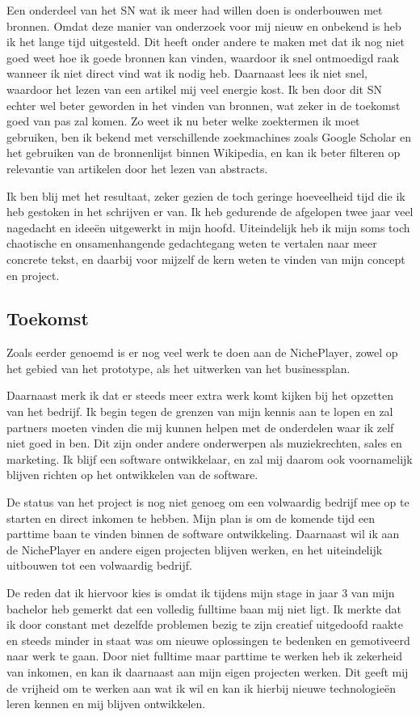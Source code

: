 Een onderdeel van het SN wat ik meer had willen doen is onderbouwen met bronnen. Omdat deze manier van onderzoek voor mij nieuw en onbekend is heb ik het lange tijd uitgesteld. Dit heeft onder andere te maken met dat ik nog niet goed weet hoe ik goede bronnen kan vinden, waardoor ik snel ontmoedigd raak wanneer ik niet direct vind wat ik nodig heb. Daarnaast lees ik niet snel, waardoor het lezen van een artikel mij veel energie kost. Ik ben door dit SN echter wel beter geworden in het vinden van bronnen, wat zeker in de toekomst goed van pas zal komen. Zo weet ik nu beter welke zoektermen ik moet gebruiken, ben ik bekend met verschillende zoekmachines zoals Google Scholar en het gebruiken van de bronnenlijst binnen Wikipedia, en kan ik beter filteren op relevantie van artikelen door het lezen van abstracts.

Ik ben blij met het resultaat, zeker gezien de toch geringe hoeveelheid tijd die ik heb gestoken in het schrijven er van. Ik heb gedurende de afgelopen twee jaar veel nagedacht en ideeën uitgewerkt in mijn hoofd. Uiteindelijk heb ik mijn soms toch chaotische en onsamenhangende gedachtegang weten te vertalen naar meer concrete tekst, en daarbij voor mijzelf de kern weten te vinden van mijn concept en project.

\subsection{Toekomst}
Zoals eerder genoemd is er nog veel werk te doen aan de NichePlayer, zowel op het gebied van het prototype, als het uitwerken van het businessplan.

Daarnaast merk ik dat er steeds meer extra werk komt kijken bij het opzetten van het bedrijf. Ik begin tegen de grenzen van mijn kennis aan te lopen en zal partners moeten vinden die mij kunnen helpen met de onderdelen waar ik zelf niet goed in ben. Dit zijn onder andere onderwerpen als muziekrechten, sales en marketing. Ik blijf een software ontwikkelaar, en zal mij daarom ook voornamelijk blijven richten op het ontwikkelen van de software.

De status van het project is nog niet genoeg om een volwaardig bedrijf mee op te starten en direct inkomen te hebben. Mijn plan is om de komende tijd een parttime baan te vinden binnen de software ontwikkeling. Daarnaast wil ik aan de NichePlayer en andere eigen projecten blijven werken, en het uiteindelijk uitbouwen tot een volwaardig bedrijf.

De reden dat ik hiervoor kies is omdat ik tijdens mijn stage in jaar 3 van mijn bachelor heb gemerkt dat een volledig fulltime baan mij niet ligt. Ik merkte dat ik door constant met dezelfde problemen bezig te zijn creatief uitgedoofd raakte en steeds minder in staat was om nieuwe oplossingen te bedenken en gemotiveerd naar werk te gaan. Door niet fulltime maar parttime te werken heb ik zekerheid van inkomen, en kan ik daarnaast aan mijn eigen projecten werken. Dit geeft mij de vrijheid om te werken aan wat ik wil en kan ik hierbij nieuwe technologieën leren kennen en mij blijven ontwikkelen.

